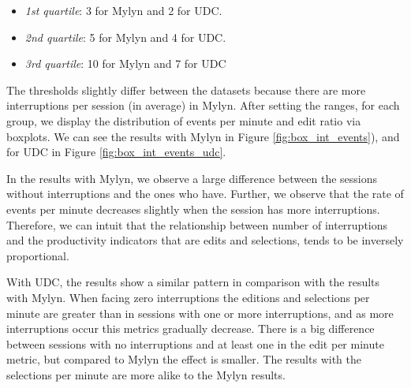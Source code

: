 \documentclass[times]{smrauth}
\begin{document}
\begin{itemize}
	\item \textit{1st quartile}: 3 for Mylyn and 2 for UDC.
	\item \textit{2nd quartile}: 5 for Mylyn and 4 for UDC.
	\item \textit{3rd quartile}: 10 for Mylyn and 7 for UDC
\end{itemize}

The thresholds slightly differ between the datasets because there are more interruptions per session (in average) in Mylyn. After setting the ranges, for each group, we display the distribution of events per minute and edit ratio via boxplots. We can see the results with Mylyn in Figure \ref{fig:box_int_events}), and for UDC in Figure \ref{fig:box_int_events_udc}.

In the results with Mylyn, we observe a large difference between the sessions without interruptions and the ones who have. Further, we observe that the rate of events per minute decreases slightly when the session has more interruptions. Therefore, we can intuit that the relationship between number of interruptions and the productivity indicators that are edits and selections, tends to be inversely proportional. 

With UDC, the results show a similar pattern in comparison with the results with Mylyn. When facing zero interruptions the editions and selections per minute are greater than in sessions with one or more interruptions, and as more interruptions occur this metrics gradually decrease. There is a big difference between sessions with no interruptions and at least one in the edit per minute metric, but compared to Mylyn the effect is smaller. The results with the selections per minute are more alike to the Mylyn results.


\end{document}
